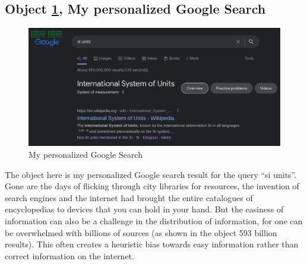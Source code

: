 \documentclass[a4paper,11pt]{article}
\begin{document}




\subsection*{Object \ref{fig:download}, My personalized Google Search}

\begin{figure}[h!]
 \centering
 \includegraphics[scale=0.25]{si.png}
 \caption{My personalized Google Search}
 \label{fig:download}
\end{figure}

The object here is my personalized Google search result for the query ``si units''. Gone are the days of flicking through city libraries for resources, the invention of search engines and the internet had brought the entire catalogues of encyclopedias to devices that you can hold in your hand. But the easiness of information can also be a challenge in the distribution of information, for one can be overwhelmed with billions of sources (as shown in the object 593 billion results). This often creates a heuristic bias towards easy information rather than correct information on the internet.
\end{document}
